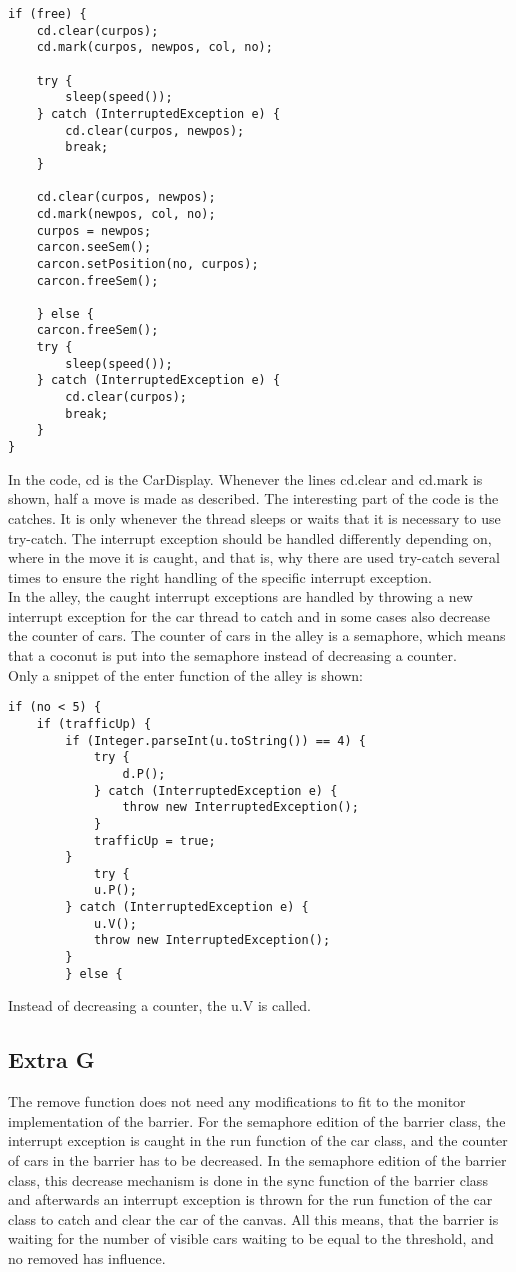 \begin{lstlisting}
if (free) {
	cd.clear(curpos);
	cd.mark(curpos, newpos, col, no);

	try {
		sleep(speed());
	} catch (InterruptedException e) {
		cd.clear(curpos, newpos);
		break;
	}

	cd.clear(curpos, newpos);
	cd.mark(newpos, col, no);
	curpos = newpos;
	carcon.seeSem();
	carcon.setPosition(no, curpos);
	carcon.freeSem();

	} else {
	carcon.freeSem();
	try {
		sleep(speed());
	} catch (InterruptedException e) {
		cd.clear(curpos);
		break;
	}
}
\end{lstlisting}
\vspace{.8cm}

In the code, cd is the CarDisplay. Whenever the lines cd.clear and cd.mark is shown, half a move is made as described. The interesting part of the code is the catches. It is only whenever the thread sleeps or waits that it is necessary to use try-catch. The interrupt exception should be handled differently depending on, where in the move it is caught, and that is, why there are used try-catch several times to ensure the right handling of the specific interrupt exception. \\

In the alley, the caught interrupt exceptions are handled by throwing a new interrupt exception for the car thread to catch and in some cases also decrease the counter of cars. The counter of cars in the alley is a semaphore, which means that a coconut is put into the semaphore instead of decreasing a counter. \\
Only a snippet of the enter function of the alley is shown:

\begin{lstlisting}
if (no < 5) {
	if (trafficUp) {
		if (Integer.parseInt(u.toString()) == 4) {
			try {
				d.P();
			} catch (InterruptedException e) {
				throw new InterruptedException();
			}
			trafficUp = true;
		}
			try {
			u.P();
		} catch (InterruptedException e) {
			u.V();
			throw new InterruptedException();
		}
		} else {
\end{lstlisting}
\vspace{.8cm}

Instead of decreasing a counter, the u.V is called.

\subsection{Extra G}
The remove function does not need any modifications to fit to the monitor implementation of the barrier. For the semaphore edition of the barrier class, the interrupt exception is caught in the run function of the car class, and the counter of cars in the barrier has to be decreased. In the semaphore edition of the barrier class, this decrease mechanism is done in the sync function of the barrier class and afterwards an interrupt exception is thrown for the run function of the car class to catch and clear the car of the canvas. All this means, that the barrier is waiting for the number of visible cars waiting to be equal to the threshold, and no removed has influence.